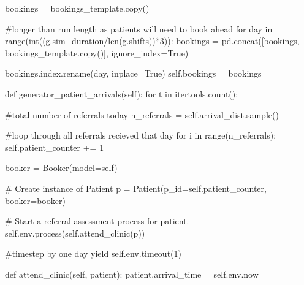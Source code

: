 \documentclass[
  letterpaper,
  DIV=11,
  numbers=noendperiod]{scrreprt}
\newenvironment{Shaded}{}{}
\newcommand{\BuiltInTok}[1]{\textcolor[rgb]{0.84,0.23,0.29}{#1}}
\newcommand{\CommentTok}[1]{\textcolor[rgb]{0.42,0.45,0.49}{#1}}
\newcommand{\ControlFlowTok}[1]{\textcolor[rgb]{0.84,0.23,0.29}{#1}}
\newcommand{\DecValTok}[1]{\textcolor[rgb]{0.00,0.36,0.77}{#1}}
\newcommand{\KeywordTok}[1]{\textcolor[rgb]{0.84,0.23,0.29}{#1}}
\newcommand{\NormalTok}[1]{\textcolor[rgb]{0.14,0.16,0.18}{#1}}
\newcommand{\OperatorTok}[1]{\textcolor[rgb]{0.14,0.16,0.18}{#1}}
\newcommand{\StringTok}[1]{\textcolor[rgb]{0.01,0.18,0.38}{#1}}
\newcommand{\VariableTok}[1]{\textcolor[rgb]{0.89,0.38,0.04}{#1}}
\begin{document}
\begin{Shaded}
\begin{Highlighting}[]
\NormalTok{        bookings }\OperatorTok{=}\NormalTok{ bookings\_template.copy()}

        \CommentTok{\#longer than run length as patients will need to book ahead}
        \ControlFlowTok{for}\NormalTok{ day }\KeywordTok{in} \BuiltInTok{range}\NormalTok{(}\BuiltInTok{int}\NormalTok{((g.sim\_duration}\OperatorTok{/}\BuiltInTok{len}\NormalTok{(g.shifts))}\OperatorTok{*}\DecValTok{3}\NormalTok{)):}
\NormalTok{            bookings }\OperatorTok{=}\NormalTok{ pd.concat([bookings, bookings\_template.copy()],}
\NormalTok{                                 ignore\_index}\OperatorTok{=}\VariableTok{True}\NormalTok{)}

\NormalTok{        bookings.index.rename(}\StringTok{\textquotesingle{}day\textquotesingle{}}\NormalTok{, inplace}\OperatorTok{=}\VariableTok{True}\NormalTok{)}
        \VariableTok{self}\NormalTok{.bookings }\OperatorTok{=}\NormalTok{ bookings}

    \KeywordTok{def}\NormalTok{ generator\_patient\_arrivals(}\VariableTok{self}\NormalTok{):}
        \ControlFlowTok{for}\NormalTok{ t }\KeywordTok{in}\NormalTok{ itertools.count():}

            \CommentTok{\#total number of referrals today}
\NormalTok{            n\_referrals }\OperatorTok{=} \VariableTok{self}\NormalTok{.arrival\_dist.sample()}

            \CommentTok{\#loop through all referrals recieved that day}
            \ControlFlowTok{for}\NormalTok{ i }\KeywordTok{in} \BuiltInTok{range}\NormalTok{(n\_referrals):}
                \VariableTok{self}\NormalTok{.patient\_counter }\OperatorTok{+=} \DecValTok{1}

\NormalTok{                booker }\OperatorTok{=}\NormalTok{ Booker(model}\OperatorTok{=}\VariableTok{self}\NormalTok{)}

                \CommentTok{\# Create instance of Patient}
\NormalTok{                p }\OperatorTok{=}\NormalTok{ Patient(p\_id}\OperatorTok{=}\VariableTok{self}\NormalTok{.patient\_counter, booker}\OperatorTok{=}\NormalTok{booker)}

                \CommentTok{\# Start a referral assessment process for patient.}
                \VariableTok{self}\NormalTok{.env.process(}\VariableTok{self}\NormalTok{.attend\_clinic(p))}

            \CommentTok{\#timestep by one day}
            \ControlFlowTok{yield} \VariableTok{self}\NormalTok{.env.timeout(}\DecValTok{1}\NormalTok{)}

    \KeywordTok{def}\NormalTok{ attend\_clinic(}\VariableTok{self}\NormalTok{, patient):}
\NormalTok{        patient.arrival\_time }\OperatorTok{=} \VariableTok{self}\NormalTok{.env.now}


\end{Highlighting}
\end{Shaded}
\end{document}
